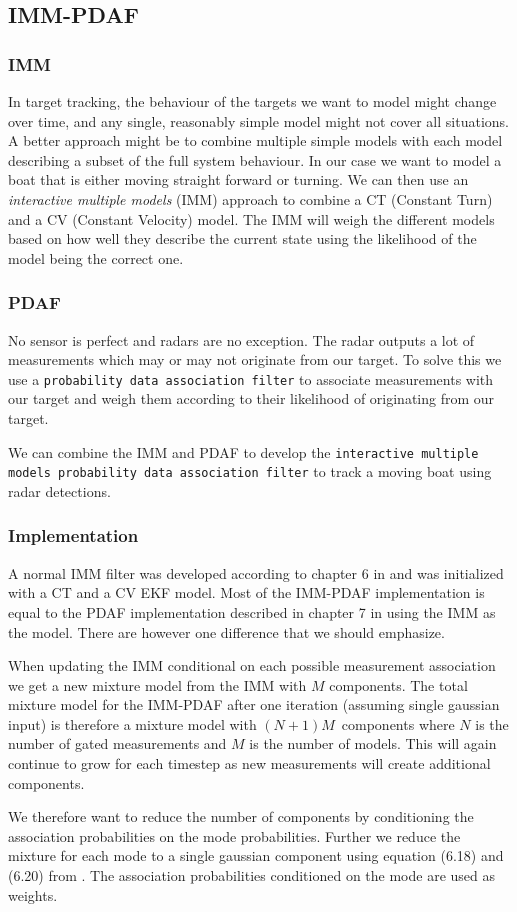\subsection{IMM-PDAF}
\subsubsection{IMM}
In target tracking, the behaviour of the targets we want to model might change over time, and any single, reasonably simple model might not cover all situations. A better approach might be to combine multiple simple models with each model describing a subset of the full system behaviour. In our case we want to model a boat that is either moving straight forward or turning. We can then use an \textit{interactive multiple models} (IMM) approach to combine a CT (Constant Turn) and a CV (Constant Velocity) model. The IMM will weigh the different models based on how well they describe the current state using the likelihood of the model being the correct one.

\subsubsection{PDAF}
No sensor is perfect and radars are no exception. The radar outputs a lot of measurements which may or may not originate from our target. To solve this we use a \texttt{probability data association filter} to associate measurements with our target and weigh them according to their likelihood of originating from our target.

We can combine the IMM and PDAF to develop the \texttt{interactive multiple models probability data association filter} to track a moving boat using radar detections.

\subsubsection{Implementation}
A normal IMM filter was developed according to chapter 6 in \cite{edmund} and was initialized with a CT and a CV EKF model. Most of the IMM-PDAF implementation is equal to the PDAF implementation described in chapter 7 in \cite{edmund} using the IMM as the model. There are however one difference that we should emphasize.

When updating the IMM conditional on each possible measurement association we get a new mixture model from the IMM with $M$ components. The total mixture model for the IMM-PDAF after one iteration (assuming single gaussian input) is therefore a mixture model with $(N+1)M$ components where $N$ is the number of gated measurements and $M$ is the number of models. This will again continue to grow for each timestep as new measurements will create additional components.

We therefore want to reduce the number of components by conditioning the association probabilities on the mode probabilities. Further we reduce the mixture for each mode to a single gaussian component using equation (6.18) and (6.20) from \cite{edmund}. The association probabilities conditioned on the mode are used as weights.



